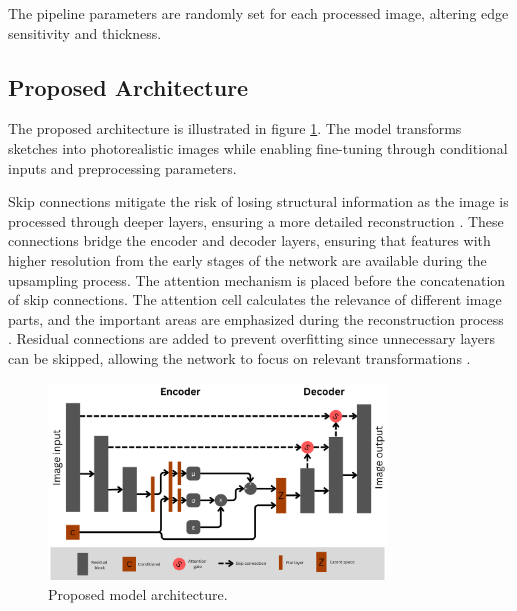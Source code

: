 \documentclass{IEEEcsmag}
\begin{document}
The pipeline parameters are randomly set for each processed image, altering edge sensitivity and thickness.

\subsection{Proposed Architecture}
\label{subsec:architecture}

The proposed architecture is illustrated in figure \ref{fig:cvae architecture}. The model transforms sketches into photorealistic images while enabling fine-tuning through conditional inputs and preprocessing parameters.

Skip connections mitigate the risk of losing structural information as the image is processed through deeper layers, ensuring a more detailed reconstruction \cite{he2016}. These connections bridge the encoder and decoder layers, ensuring that features with higher resolution from the early stages of the network are available during the upsampling process. The attention mechanism is placed before the concatenation of skip connections. The attention cell calculates the relevance of different image parts, and the important areas are emphasized during the reconstruction process \cite{oktay2022}. Residual connections are added to prevent overfitting since unnecessary layers can be skipped, allowing the network to focus on relevant transformations \cite{he2016}.

\begin{figure}
    \centering
    \includegraphics[width=0.8\textwidth]{images/architechture.png}
    \caption{Proposed model architecture.}
    \label{fig:cvae architecture}
\end{figure}

\end{document}

